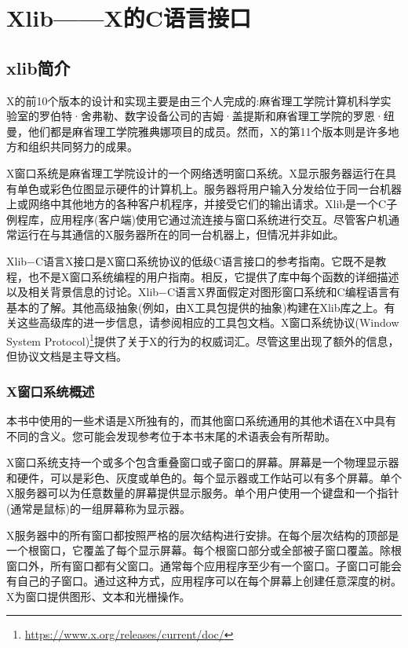\chapter{Xlib——X的C语言接口}


\section{xlib简介}

X的前10个版本的设计和实现主要是由三个人完成的:麻省理工学院计算机科学实验室的罗伯特·舍弗勒、数字设备公司的吉姆·盖提斯和麻省理工学院的罗恩·纽曼，他们都是麻省理工学院雅典娜项目的成员。然而，X的第11个版本则是许多地方和组织共同努力的成果。

X窗口系统是麻省理工学院设计的一个网络透明窗口系统。X显示服务器运行在具有单色或彩色位图显示硬件的计算机上。服务器将用户输入分发给位于同一台机器上或网络中其他地方的各种客户机程序，并接受它们的输出请求。Xlib是一个C子例程库，应用程序(客户端)使用它通过流连接与窗口系统进行交互。尽管客户机通常运行在与其通信的X服务器所在的同一台机器上，但情况并非如此。

Xlib−C语言X接口是X窗口系统协议的低级C语言接口的参考指南。它既不是教程，也不是X窗口系统编程的用户指南。相反，它提供了库中每个函数的详细描述以及相关背景信息的讨论。Xlib−C语言X界面假定对图形窗口系统和C编程语言有基本的了解。其他高级抽象(例如，由X工具包提供的抽象)构建在Xlib库之上。有关这些高级库的进一步信息，请参阅相应的工具包文档。X窗口系统协议(Window System Protocol)\footnote{\url{https://www.x.org/releases/current/doc/}}提供了关于X的行为的权威词汇。尽管这里出现了额外的信息，但协议文档是主导文档。

\subsection{X窗口系统概述}

本书中使用的一些术语是X所独有的，而其他窗口系统通用的其他术语在X中具有不同的含义。您可能会发现参考位于本书末尾的术语表会有所帮助。

X窗口系统支持一个或多个包含重叠窗口或子窗口的屏幕。屏幕是一个物理显示器和硬件，可以是彩色、灰度或单色的。每个显示器或工作站可以有多个屏幕。单个X服务器可以为任意数量的屏幕提供显示服务。单个用户使用一个键盘和一个指针(通常是鼠标)的一组屏幕称为显示器。

X服务器中的所有窗口都按照严格的层次结构进行安排。在每个层次结构的顶部是一个根窗口，它覆盖了每个显示屏幕。每个根窗口部分或全部被子窗口覆盖。除根窗口外，所有窗口都有父窗口。通常每个应用程序至少有一个窗口。子窗口可能会有自己的子窗口。通过这种方式，应用程序可以在每个屏幕上创建任意深度的树。X为窗口提供图形、文本和光栅操作。

